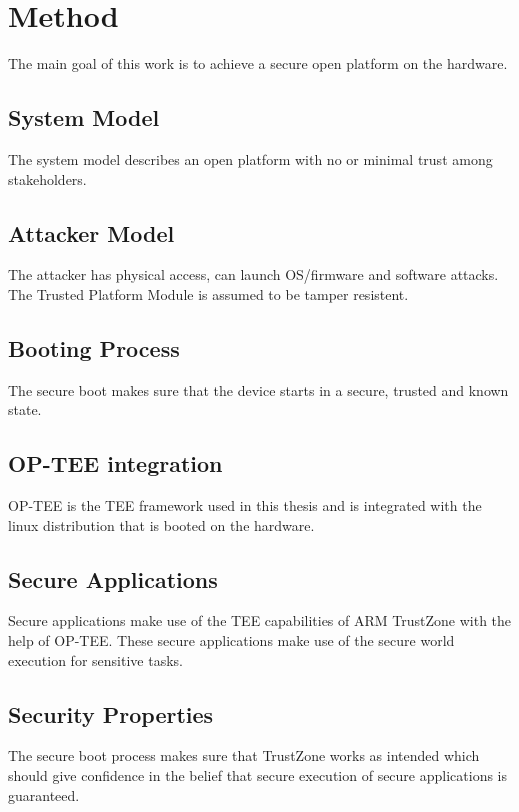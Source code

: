 \documentclass{report}
\begin{document}
\chapter{Method}

The main goal of this work is to achieve a secure open platform on the hardware.

\section{System Model}

The system model describes an open platform with no or minimal trust among stakeholders.

\section{Attacker Model}

The attacker has physical access, can launch OS/firmware and software attacks. The Trusted Platform Module is assumed to be tamper resistent.

\section{Booting Process}

The secure boot makes sure that the device starts in a secure, trusted and known state.

\section{OP-TEE integration}

OP-TEE is the TEE framework used in this thesis and is integrated with the linux distribution that is booted on the hardware.

\section{Secure Applications}

Secure applications make use of the TEE capabilities of ARM TrustZone with the help of OP-TEE. These secure applications make use of the secure world execution for sensitive tasks.

\section{Security Properties}

The secure boot process makes sure that TrustZone works as intended which should give confidence in the belief that secure execution of secure applications is guaranteed.
\end{document}
